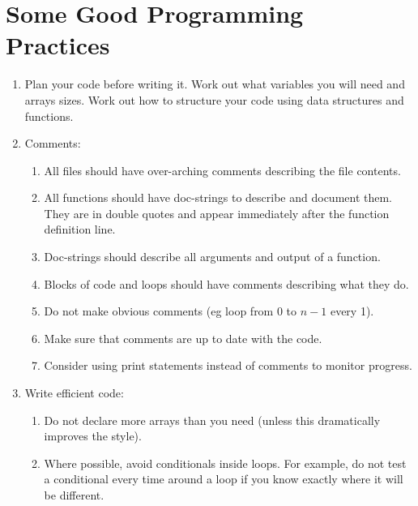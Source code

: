 \section{Some Good Programming Practices}\label{sec:goodCode}

\begin{enumerate}
\item Plan your code before writing it. Work out what variables you will need and arrays sizes. Work out how to structure your code using data structures and functions.
\item Comments:
    \begin{enumerate}
    \item All files should have over-arching comments describing the file contents. 
    \item All functions should have doc-strings to describe and document them. They are in double quotes and appear immediately after the function definition line. 
    \item Doc-strings should describe all arguments and output of a function.
    \item Blocks of code and loops should have comments describing what they do.
    \item Do not make obvious comments (eg loop from 0 to $n-1$ every 1).
    \item Make sure that comments are up to date with the code.
    \item Consider using print statements instead of comments to monitor progress.
    \end{enumerate}

\item Write efficient code:
    \begin{enumerate}
    \item Do not declare more arrays than you need (unless this dramatically improves the style).
    \item Where possible, avoid conditionals inside loops. For example, do not test a conditional every time around a loop if you know exactly where it will be different.
    

\end{enumerate}
\end{enumerate}

